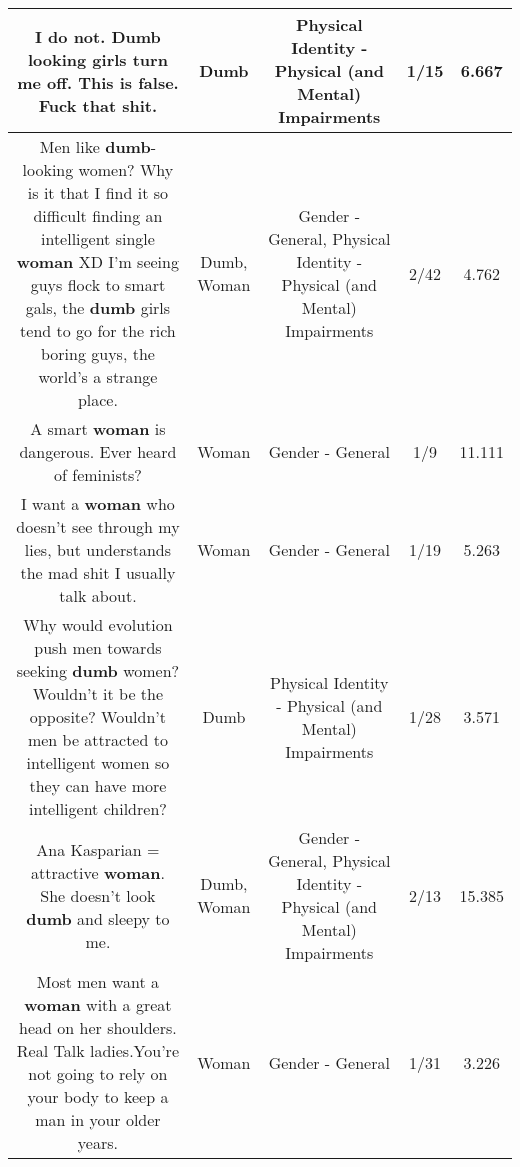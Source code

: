 \documentclass[11pt]{article}
\newlength\mylength
\begin{document}
\begin{center}
\begin{longtable}{|C{.65\mylength}|C{.30\mylength}|C{.12\mylength}|C{.12\mylength}|C{.12\mylength}|}
  \small I do not. \textbf{Dumb} looking girls turn me off. This is false. Fuck that shit.\normalsize   & Dumb & Physical Identity - Physical (and Mental) Impairments & 1/15 & 6.667 \\  \hline
  \small Men like \textbf{dumb}-looking women? Why is it that I find it so difficult finding an intelligent single \textbf{woman} XD I'm seeing guys flock to smart gals, the \textbf{dumb} girls tend to go for the rich boring guys, the world's a strange place.\normalsize   & Dumb, Woman & Gender - General, Physical Identity - Physical (and Mental) Impairments & 2/42 & 4.762 \\  \hline
  \small A smart \textbf{woman} is dangerous. Ever heard of feminists?\normalsize   & Woman & Gender - General & 1/9 & 11.111 \\  \hline
  \small I want a \textbf{woman} who doesn't see through my lies, but understands the mad shit I usually talk about.\normalsize   & Woman & Gender - General & 1/19 & 5.263 \\  \hline
  \small Why would evolution push men towards seeking \textbf{dumb} women?  Wouldn't it be the opposite?  Wouldn't men be attracted to intelligent women so they can have more intelligent children?\normalsize   & Dumb & Physical Identity - Physical (and Mental) Impairments & 1/28 & 3.571 \\  \hline
  \small Ana Kasparian = attractive \textbf{woman}. She doesn't look \textbf{dumb} and sleepy to me.\normalsize   & Dumb, Woman & Gender - General, Physical Identity - Physical (and Mental) Impairments & 2/13 & 15.385 \\  \hline
  \small Most men want a \textbf{woman} with a great head on her shoulders. Real Talk ladies.You're not going to rely on your body to keep a man in your older years.\normalsize   & Woman & Gender - General & 1/31 & 3.226 \\  \hline

\end{longtable}
\end{center}
\end{document}
